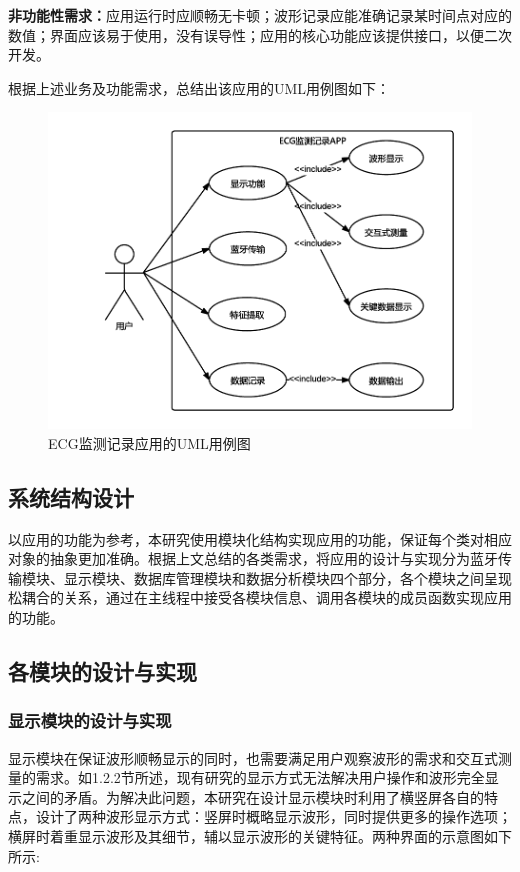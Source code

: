\textbf{非功能性需求：}应用运行时应顺畅无卡顿；波形记录应能准确记录某时间点对应的数值；界面应该易于使用，没有误导性；应用的核心功能应该提供接口，以便二次开发。

根据上述业务及功能需求，总结出该应用的UML用例图如下：

\begin{figure}[htbp]
\centering
\includegraphics[width=0.8\columnwidth]{fig3-3.png}
\caption{
\label{fig3-3}
ECG监测记录应用的UML用例图
}
\end{figure}

\subsection{系统结构设计}

以应用的功能为参考，本研究使用模块化结构实现应用的功能，保证每个类对相应对象的抽象更加准确。根据上文总结的各类需求，将应用的设计与实现分为蓝牙传输模块、显示模块、数据库管理模块和数据分析模块四个部分，各个模块之间呈现松耦合的关系，通过在主线程中接受各模块信息、调用各模块的成员函数实现应用的功能。

\subsection{各模块的设计与实现}
\subsubsection{显示模块的设计与实现}
显示模块在保证波形顺畅显示的同时，也需要满足用户观察波形的需求和交互式测量的需求。如1.2.2节所述，现有研究的显示方式无法解决用户操作和波形完全显示之间的矛盾。为解决此问题，本研究在设计显示模块时利用了横竖屏各自的特点，设计了两种波形显示方式：竖屏时概略显示波形，同时提供更多的操作选项；横屏时着重显示波形及其细节，辅以显示波形的关键特征。两种界面的示意图如下所示:

